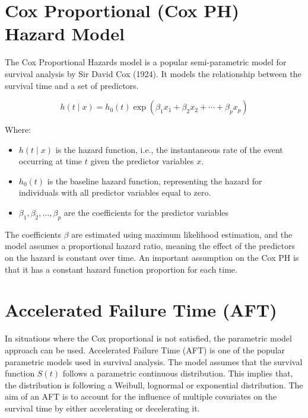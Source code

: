 \documentclass[doublespacing]{report} %
\begin{document}
\section{Cox Proportional (Cox PH) Hazard Model}

The Cox Proportional Hazards model is a popular semi-parametric model for survival analysis by Sir David Cox (1924). It models the relationship between the survival time and a set of predictors.

\[
h\left(t \mid x\right) = h_0(t) \exp(\beta_1 x_1 + \beta_2 x_2 + \cdots + \beta_p x_p)
\]

Where:
 \begin{itemize}
     \item \(h(t\mid x)\) is the hazard function, i.e., the instantaneous rate of the event occurring at time \(t\) given the predictor variables \(x\).
     \item \(h_0\left(t\right)\) is the baseline hazard function, representing the hazard for individuals with all predictor variables equal to zero.
     \item \(\beta_1,\beta_2,\ldots,\beta_p\) are the coefficients for the predictor variables
 \end{itemize}

 The coefficients \(\beta\) are estimated using maximum likelihood estimation, and the model assumes a proportional hazard ratio, meaning the effect of the predictors on the hazard is constant over time.
An important assumption on the Cox PH is that it has a constant hazard function proportion for each time.


%
%


\section{Accelerated Failure Time (AFT)}

In situations where the Cox proportional is not satisfied, the parametric model approach can be used. Accelerated Failure Time (AFT) is one of the popular parametric models used in survival analysis. The model assumes that the survival function \(S(t)\) follows a parametric continuous distribution. This implies that, the distribution is following a Weibull, lognormal or exponential distribution. The aim of an AFT is to account for the influence of multiple covariates on the survival time by either accelerating or decelerating it.
\end{document}
